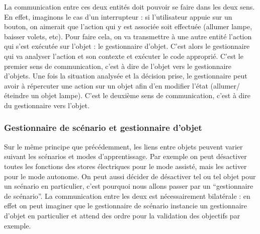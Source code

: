 La communication entre ces deux entités doit pouvoir se faire dans les deux sens.
En effet, imaginons le cas d'un interrupteur : si l'utilisateur appuie sur un bouton, on aimerait que l'action qui y est associée soit effectuée (allumer lampe, baisser volets, etc).
Pour faire cela, on va transmettre à une autre entité l'action qui s'est exécutée sur l'objet : le gestionnaire d'objet.
C'est alors le gestionnaire qui va analyser l'action et son contexte et exécuter le code approprié. C'est le premier sens de communication, c'est à dire de l'objet vers le gestionnaire d'objets.
Une fois la situation analysée et la décision prise, le gestionnaire peut avoir à répercuter une action sur un objet afin d'en modifier l'état (allumer/éteindre un objet lampe).
C'est le deuxième sens de communication, c'est à dire du gestionnaire vers l'objet.

\subsubsection{Gestionnaire de scénario et gestionnaire d'objet}

Sur le même principe que précédemment, les liens entre objets peuvent varier suivant les scénarios et modes d'apprentissage.
Par exemple on peut désactiver toutes les fonctions des stores électriques pour le mode assisté, mais les activer pour le mode autonome.
On peut aussi décider de désactiver tel ou tel objet pour un scénario en particulier, c'est pourquoi nous allons passer par un \enquote{gestionnaire de scénario}.
La communication entre les deux est nécessairement bilatérale : en effet on peut imaginer que le gestionnaire de scénario instancie un gestionnaire d'objet en particulier et attend des ordre pour la validation des objectifs par exemple.

